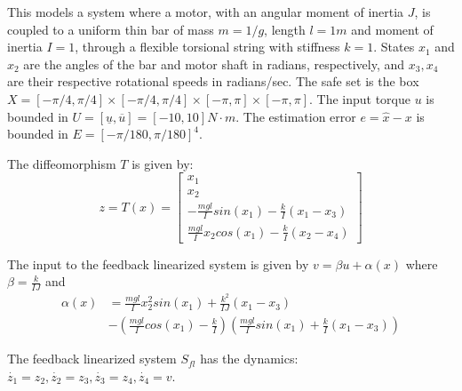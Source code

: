 This models a system where a motor, with an angular moment of inertia $J$,  is coupled to a uniform thin bar of mass $m=1/g$, length $l=1m$ and moment of inertia $I=1$, through a flexible torsional string with stiffness $k=1$. 
States $x_1$ and $x_2$ are the angles of the bar and motor shaft in radians, respectively, and $x_3, x_4$ are their respective rotational speeds in radians/sec.
The safe set is the box $X = [-\pi/4,\pi/4] \times [-\pi/4,\pi/4] \times [-\pi,\pi] \times [-\pi,\pi]$.
The input torque $u$ is bounded in $U = [\underline{u}, \overline{u}] = [-10 , 10 ]N\cdot m$. 
The estimation error $e = \hat{x} - x$ is bounded in $E = [-\pi /180, \pi /180]^4$.

The diffeomorphism $T$ is given by:
\begin{equation}
z = T(x) = \begin{bmatrix} x_1 \\ x_2 \\ -\frac{mgl}{I}sin(x_1) -\frac{k}{I}(x_1-x_3) \\ \frac{mgl}{I}x_2cos(x_1) - \frac{k}{I}(x_2-x_4)   \end{bmatrix}
\end{equation}

The input to the feedback linearized system is given by $v=\beta u+ \alpha(x)$ where $\beta=\frac{k}{IJ} $ and 
\begin{subequations}
\label{eq:fblin_inp}
\begin{align}
\alpha(x)&=\frac{mgl}{I}x_2^2sin(x_1) + \frac{k^2}{IJ}(x_1-x_3) \nonumber \\
&- (\frac{mgl}{I}cos(x_1)-\frac{k}{I})(\frac{mgl}{I}sin(x_1)+\frac{k}{I}(x_1-x_3))
\end{align}
\end{subequations}

The feedback linearized system $S_{fl}$ has the dynamics:
$\dot{z_1} = z_2, \dot{z_2} = z_3, \dot{z_3} = z_4, \dot{z_4} = v$.


